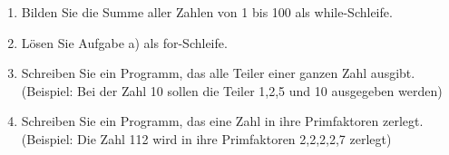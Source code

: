\begin{enumerate}

\item Bilden Sie die Summe aller Zahlen von 1 bis 100 als while-Schleife.

\item Lösen Sie Aufgabe a) als for-Schleife.

\item Schreiben Sie ein Programm, das alle Teiler einer ganzen Zahl ausgibt. (Beispiel: Bei der Zahl 10 sollen die Teiler 1,2,5 und 10 ausgegeben werden)

\item Schreiben Sie ein Programm, das eine Zahl in ihre Primfaktoren zerlegt. (Beispiel: Die Zahl 112 wird in ihre Primfaktoren 2,2,2,2,7 zerlegt)

\end{enumerate}